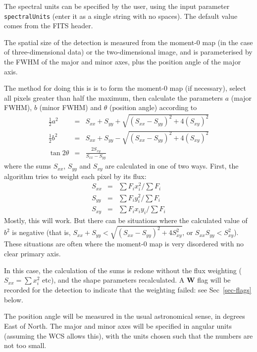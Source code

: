 The spectral units can be specified by the user, using the input
parameter \texttt{spectralUnits} (enter it as a single string with no
spaces). The default value comes from the FITS header. 

\label{sec-shape}

The spatial size of the detection is measured from the moment-0 map
(in the case of three-dimensional data) or the two-dimensional image,
and is parameterised by the FWHM of the major and minor axes, plus the
position angle of the major axis.

The method for doing this is is to form the moment-0 map (if
necessary), select all pixels greater than half the maximum, then
calculate the parameters $a$ (major FWHM), $b$ (minor FWHM) and
$\theta$ (position angle) according to 
\begin{eqnarray*}
\frac{1}{2} a^2  &= & S_{xx} + S_{yy} + \sqrt{ (S_{xx} -
  S_{yy})^2 + 4 (S_{xy})^2}\\
\frac{1}{2} b^2  &= & S_{xx} + S_{yy} - \sqrt{ (S_{xx} -
  S_{yy})^2 + 4 (S_{xy})^2}\\
\tan 2\theta &= &\frac{2 S_{xy}}{S_{xx} - S_{yy}}
\end{eqnarray*}
where the sums $S_{xx}$, $S_{yy}$ and $S_{xy}$ are calculated in one
of two ways. First, the algorithm tries to weight each pixel by its
flux:
\begin{eqnarray*}
S_{xx} &= &\sum F_i x_i^2 / \sum F_i\\
S_{yy} &= &\sum F_i y_i^2 / \sum F_i\\
S_{xy} &= &\sum F_i x_i y_i / \sum F_i
\end{eqnarray*}
Mostly, this will work. But there can be situations where the
calculated value of $b^2$ is negative (that is, $S_{xx}+S_{yy} <
\sqrt{(S_{xx}-S_{yy})^2+4S_{xy}^2}$, or $S_{xx}S_{yy}<S_{xy}^2$). These situations are
often where the moment-0 map is very disordered with no clear primary
axis.

In this case, the calculation of the sums is redone without the flux
weighting ($S_{xx} = \sum x_i^2$ etc), and the shape parameters
recalculated. A \textbf{W} flag will be recorded for the detection to
indicate that the weighting failed: see Sec~\ref{sec-flags} below.

The position angle will be measured in the usual astronomical sense,
in degrees East of North. The major and minor axes will be specified
in angular units (assuming the WCS allows this), with the units chosen
such that the numbers are not too small.


